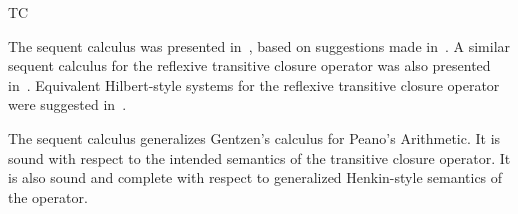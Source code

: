 \begin{entry}{TC}
\begin{history}
  The sequent calculus was presented in~\cite{Cohen2014AL}, based on suggestions
  made in~\cite{AvronTC03}. A similar sequent calculus for the reflexive
  transitive closure operator was also presented in~\cite{Cohen2014AL}. Equivalent
  Hilbert-style systems for the reflexive transitive closure operator were
  suggested in~\cite{martin1943homogeneous, martin1949note, Myhill52}.
\end{history}

\begin{technicalities}
  The sequent calculus generalizes Gentzen's calculus for Peano's Arithmetic. It
  is sound with respect to the intended semantics of the transitive closure
  operator. It is also sound and complete with respect to generalized Henkin-style
  semantics of the operator.
\end{technicalities}

\end{entry}
